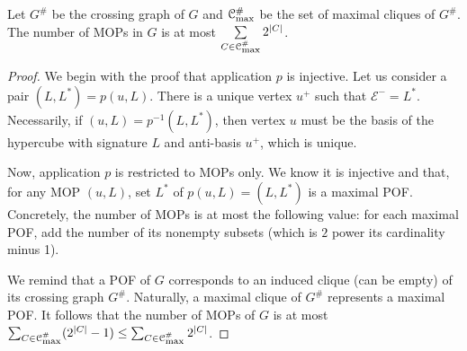 \documentclass[a4paper,UKenglish,numberwithinsect,cleveref, autoref,anonymous]{lipics-v2021}
\newcommand{\card}[1]{\left| #1 \right|}
\newcommand{\mcalcm}{\mathcal{C}_{\mbox{\scriptsize{max}}}}
\begin{document}
\begin{corollary}
Let $G^{\#}$ be the crossing graph of $G$ and $\mcalcm^{\#}$ be the set of maximal cliques of $G^{\#}$. The number of MOPs in $G$ is at most $\sum\limits_{C \in \mcalcm^{\#}} 2^{\card{C}}$. 
\label{co:mop_crossing}
\end{corollary}
\begin{proof}
We begin with the proof that application $p$ is injective. Let us consider a pair $(L,L^*) = p(u,L)$. There is a unique vertex $u^+$ such that $\mathcal{E}^- = L^*$. Necessarily, if $(u,L) = p^{-1}(L,L^*)$, then vertex $u$ must be the basis of the hypercube with signature $L$ and anti-basis $u^+$, which is unique.

Now, application $p$ is restricted to MOPs only. We know it is injective and that, for any MOP $(u,L)$, set $L^*$ of $p(u,L) = (L,L^*)$ is a maximal POF. Concretely, the number of MOPs is at most the following value: for each maximal POF, add the number of its nonempty subsets (which is $2$ power its cardinality minus 1).

We remind that a POF of $G$ corresponds to an induced clique (can be empty) of its crossing graph $G^{\#}$. Naturally, a maximal clique of $G^{\#}$ represents a maximal POF. It follows that the number of MOPs of $G$ is at most $\sum_{C \in \mcalcm^{\#}} (2^{\card{C}} - 1) \le \sum_{C \in \mcalcm^{\#}} 2^{\card{C}}$.
\end{proof}
\end{document}
